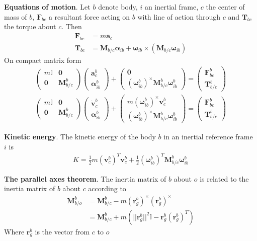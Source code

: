 \textbf{Equations of motion}. Let \(b\) denote body, \(i\) an inertial frame, \(c\) the center of mass of \(b\), \(\bm{F}_{bc}\) a resultant force acting on \(b\) with line of action through \(c\) and \(\bm{T}_{bc}\) the torque about \(c\). Then
\begin{align*}
    \bm{F}_{bc} &= m\bm{a}_c \\
    \bm{T}_{bc} &= \bm{M}_{b/c}\bm{\alpha}_{ib} + \bm{\omega}_{ib}\times(\bm{M}_{b/c}\bm{\omega}_{ib})
\end{align*}
On compact matrix form
\begin{align*}
    \begin{pmatrix} m\mathbb{I} & \bm{0} \\ \bm{0} & \bm{M}_{b/c}^b \end{pmatrix}
        \begin{pmatrix}\bm{a}_c^b \\ \bm{\alpha}_{ib}^b \end{pmatrix} + 
        \begin{pmatrix} \bm{0} \\ (\bm{\omega}_{ib}^b)^\times\bm{M}_{b/c}^b\bm{\omega}_{ib}^b\end{pmatrix} =
            \begin{pmatrix}\bm{F}_{bc}^b \\ \bm{T}_{b/c}^b\end{pmatrix} \\
    \begin{pmatrix} m\mathbb{I} & \bm{0} \\ \bm{0} & \bm{M}_{b/c}^b \end{pmatrix}
        \begin{pmatrix}\dot{\bm{v}}_c^b \\ \bm{\alpha}_{ib}^b \end{pmatrix} + 
            \begin{pmatrix} m(\bm{\omega}_{ib}^b)^\times\bm{v}_c^b \\ (\bm{\omega}_{ib}^b)^\times\bm{M}_{b/c}^b\bm{\omega}_{ib}^b\end{pmatrix} =
            \begin{pmatrix}\bm{F}_{bc}^b \\ \bm{T}_{b/c}^b\end{pmatrix}
\end{align*}

\textbf{Kinetic energy}. The kinetic energy of the body \(b\) in an inertial reference frame \(i\) is
\begin{align*}
    K = \frac{1}{2}m(\bm{v}_c^b)^T\bm{v}_c^b + \frac{1}{2}(\bm{\omega}_{ib}^b)^T\bm{M}_{b/c}^b\bm{\omega}_{ib}^b
\end{align*}

\textbf{The parallel axes theorem}. The inertia matrix of \(b\) about \(o\) is related to the inertia matrix of \(b\) about \(c\) according to
\begin{align*}
    \bm{M}_{b/o}^b &= \bm{M}_{b/c}^b-m(\bm{r}_g^b)^\times(\bm{r}_g^b)^\times \\
    &= \bm{M}_{b/c}^b+m(||\bm{r}_g^b||^2\mathbb{I}-\bm{r}_g^b(\bm{r}_g^b)^T)
\end{align*}
Where \(\bm{r}_g^b\) is the vector from \(c\) to \(o\)
